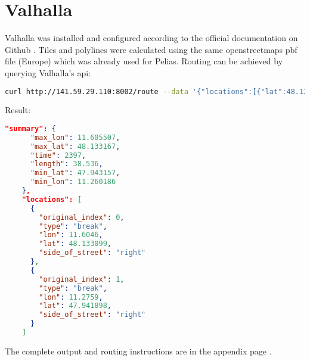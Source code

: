 
\section{Valhalla}
Valhalla was installed and configured according to the official documentation on Github \cite{Knisely2019}.
Tiles and polylines were calculated using the same openstreetmaps pbf file (Europe) which was already used for Pelias. Routing can be achieved by querying Valhalla’s api:

\begin{lstlisting}[language=bash,breaklines=true]
curl http://141.59.29.110:8002/route --data '{"locations":[{"lat":48.1331,"lon":11.6046,"type":"break"},{"lat":47.9419,"lon":11.2759,"type":"break"}],"costing":"auto","directions_options":{"units":"km"}}' | jq '.'
\end{lstlisting}

Result:

\begin{lstlisting}[language=json,breaklines=true]
    "summary": {
      "max_lon": 11.605507,
      "max_lat": 48.133167,
      "time": 2397,
      "length": 38.536,
      "min_lat": 47.943157,
      "min_lon": 11.260186
    },
    "locations": [
      {
        "original_index": 0,
        "type": "break",
        "lon": 11.6046,
        "lat": 48.133099,
        "side_of_street": "right"
      },
      {
        "original_index": 1,
        "type": "break",
        "lon": 11.2759,
        "lat": 47.941898,
        "side_of_street": "right"
      }
    ]
\end{lstlisting}

The complete output and routing instructions are in the appendix page \pageref{VRO}.